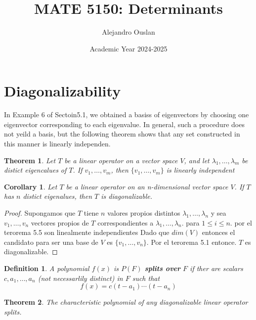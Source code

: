 \documentclass[10pt, oneside]{article}
\title{MATE 5150: Determinants}
\author{Alejandro Ouslan}
\date{Academic Year 2024-2025}
\newtheorem{thm}{Theorem}
\newtheorem{defn}{Definition}
\newtheorem{cor}{Corollary}
\begin{document}
\maketitle
\tableofcontents

\vspace{.25in}

\section{Diagonalizability}

In Example 6 of Sectoin5.1, we obtained a basiss of eigenvectors by
choosing one eigenvector corresponding to each eigenvalue. In general,
such a procedure does not yeild a basis, but the following theorem shows 
that any set constructed in this manner is linearly independen. 

\begin{thm}
  Let $T$ be a linear operator on a vector space $V$, and let 
  $\lambda_1, \ldots, \lambda_m$ be distict eigencalues of $T$. If 
  $v_1, \ldots, v_m$, then $\{v_1, \ldots, v_m\}$ is linearly independent
\end{thm}

\begin{cor}
  Let $T$ be a linear operator on an n-dimensional vector space $V$.
  If $T$ has $n$ distict eigenalues, then $T$ is diagonalizable. 
  \end{cor}

\begin{proof}
  Supongamos que $T$ tiene $n$ valores propios distintos
  $\lambda_1, \ldots, \lambda_n$ y sea $v_1, \ldots, v_n$ vectores 
  propios de $T$ correspondientes a $\lambda_1, \ldots, \lambda_n$. para 
  $1 \leq i \leq n$. por el terorema 5.5 son linealmente independientes
  Dado que $dim(V)$ entonces el candidato para ser una base 
  de $V$ es $\{v_1, \ldots, v_n\}$. Por el terorema 5.1 entonce. $T$ es diagonalizable.
\end{proof}

\begin{defn}
  A polynomial $f(x)$ is $P(F)$ \textbf{splits over} $F$ if ther are 
  scalars $c, a_1, \ldots, a_n$ (not necessarlily distinct) in $F$ such that
  \begin{equation*}
    f(x) = c(t - a_1) \cdots (t - a_n)
  \end{equation*}
\end{defn}

\begin{thm}
  The characteristic polynomial of any diagonalizable linear operator splits.
  \end{thm}
\end{document}

